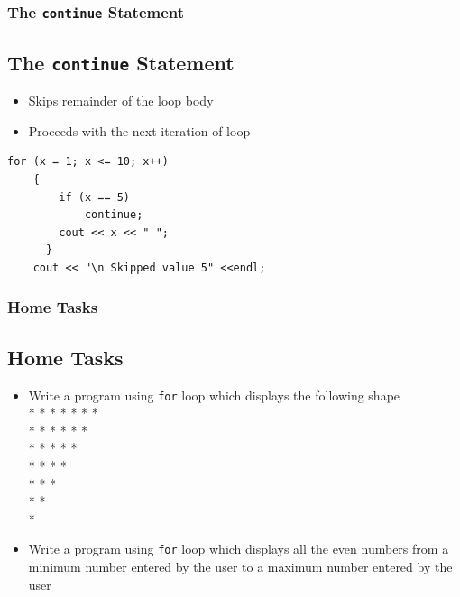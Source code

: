 \documentclass{beamer}
\begin{document}
\begin{frame} [fragile]
    \frametitle{The \texttt{continue} Statement}
    \subsection{The \texttt{continue} Statement} %
    \begin{itemize}
        \item Skips remainder of the loop body
        \item Proceeds with the next iteration of loop
    \end{itemize}
    \lstset{style=mystyle}
\begin{lstlisting}
for (x = 1; x <= 10; x++)
    {
        if (x == 5)
            continue;
        cout << x << " ";
      }
    cout << "\n Skipped value 5" <<endl;
\end{lstlisting}
\end{frame}

\begin{frame}
    \frametitle{Home Tasks}
    \subsection{Home Tasks} %
    \begin{itemize}
        \item Write a program using \texttt{for} loop which displays the following shape \\ [0.2 in]
        * * * * * * * \\
        * * * * * * \\
        * * * * * \\
        * * * * \\
        * * * \\
        * * \\
        * \\
        \item Write a program using \texttt{for} loop which displays all the even numbers from a minimum number entered by the user to a maximum number entered by the user
    \end{itemize}
\end{frame}
\end{document}
